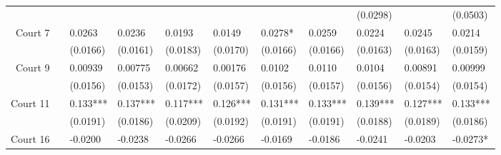 \begin{tabular}{rrrrrrrrrrr}
      & \multicolumn{1}{l}{} & \multicolumn{1}{l}{} & \multicolumn{1}{l}{} & \multicolumn{1}{l}{} & \multicolumn{1}{l}{} & \multicolumn{1}{l}{} & \multicolumn{1}{l}{} & \multicolumn{1}{l}{(0.0298)} & \multicolumn{1}{l}{} & \multicolumn{1}{l}{(0.0503)} \\
Court 7 & \multicolumn{1}{l}{} & \multicolumn{1}{l}{0.0263} & \multicolumn{1}{l}{0.0236} & \multicolumn{1}{l}{0.0193} & \multicolumn{1}{l}{0.0149} & \multicolumn{1}{l}{0.0278*} & \multicolumn{1}{l}{0.0259} & \multicolumn{1}{l}{0.0224} & \multicolumn{1}{l}{0.0245} & \multicolumn{1}{l}{0.0214} \\
      & \multicolumn{1}{l}{} & \multicolumn{1}{l}{(0.0166)} & \multicolumn{1}{l}{(0.0161)} & \multicolumn{1}{l}{(0.0183)} & \multicolumn{1}{l}{(0.0170)} & \multicolumn{1}{l}{(0.0166)} & \multicolumn{1}{l}{(0.0166)} & \multicolumn{1}{l}{(0.0163)} & \multicolumn{1}{l}{(0.0163)} & \multicolumn{1}{l}{(0.0159)} \\
Court 9 & \multicolumn{1}{l}{} & \multicolumn{1}{l}{0.00939} & \multicolumn{1}{l}{0.00775} & \multicolumn{1}{l}{0.00662} & \multicolumn{1}{l}{0.00176} & \multicolumn{1}{l}{0.0102} & \multicolumn{1}{l}{0.0110} & \multicolumn{1}{l}{0.0104} & \multicolumn{1}{l}{0.00891} & \multicolumn{1}{l}{0.00999} \\
      & \multicolumn{1}{l}{} & \multicolumn{1}{l}{(0.0156)} & \multicolumn{1}{l}{(0.0153)} & \multicolumn{1}{l}{(0.0172)} & \multicolumn{1}{l}{(0.0157)} & \multicolumn{1}{l}{(0.0156)} & \multicolumn{1}{l}{(0.0157)} & \multicolumn{1}{l}{(0.0156)} & \multicolumn{1}{l}{(0.0154)} & \multicolumn{1}{l}{(0.0154)} \\
Court 11 & \multicolumn{1}{l}{} & \multicolumn{1}{l}{0.133***} & \multicolumn{1}{l}{0.137***} & \multicolumn{1}{l}{0.117***} & \multicolumn{1}{l}{0.126***} & \multicolumn{1}{l}{0.131***} & \multicolumn{1}{l}{0.133***} & \multicolumn{1}{l}{0.139***} & \multicolumn{1}{l}{0.127***} & \multicolumn{1}{l}{0.133***} \\
      & \multicolumn{1}{l}{} & \multicolumn{1}{l}{(0.0191)} & \multicolumn{1}{l}{(0.0186)} & \multicolumn{1}{l}{(0.0209)} & \multicolumn{1}{l}{(0.0192)} & \multicolumn{1}{l}{(0.0191)} & \multicolumn{1}{l}{(0.0191)} & \multicolumn{1}{l}{(0.0188)} & \multicolumn{1}{l}{(0.0189)} & \multicolumn{1}{l}{(0.0186)} \\
Court 16 & \multicolumn{1}{l}{} & \multicolumn{1}{l}{-0.0200} & \multicolumn{1}{l}{-0.0238} & \multicolumn{1}{l}{-0.0266} & \multicolumn{1}{l}{-0.0266} & \multicolumn{1}{l}{-0.0169} & \multicolumn{1}{l}{-0.0186} & \multicolumn{1}{l}{-0.0241} & \multicolumn{1}{l}{-0.0203} & \multicolumn{1}{l}{-0.0273*} \\

\end{tabular}
